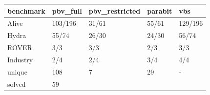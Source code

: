 \begin{tabular}{lllll}
\toprule
benchmark & pbv_full & pbv_restricted & parabit & vbs \\
\midrule
Alive & 103/196 & 31/61 & 55/61 & 129/196 \\
Hydra & 55/74 & 26/30 & 24/30 & 56/74 \\
ROVER & 3/3 & 3/3 & 2/3 & 3/3 \\
Industry & 2/4 & 2/4 & 3/4 & 4/4 \\
unique & 108 & 7 & 29 & - \\
solved & 59%
\bottomrule
\end{tabular}
